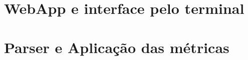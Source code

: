 \documentclass[english,a4paper]{report}
\begin{document}
\part{WebApp e interface pelo terminal}

\newpage

\newpage

\newpage
\part{Parser e Aplicação das métricas}

\newpage

\newpage

\newpage


{}

\appendix
\newpage


\end{document}

